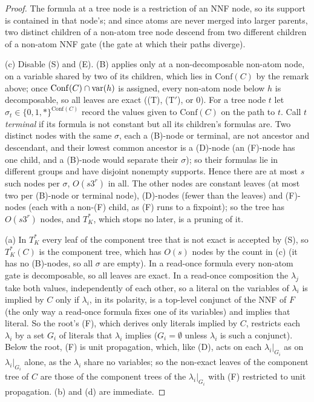\begin{proof}
The formula at a tree node is a restriction of an NNF node, so its support is
contained in that node's; and since atoms are never merged into larger parents,
two distinct children of a non-atom tree node descend from two different children
of a non-atom NNF gate (the gate at which their paths diverge).

(c) Disable (S) and (E). (B) applies only at a non-decomposable non-atom node, on
a variable shared by two of its children, which lies in $\mathrm{Conf}(C)$ by the
remark above; once $\mathrm{Conf}(C)\cap\mathrm{var}(h)$ is assigned, every non-atom node
below $h$ is decomposable, so all leaves are exact ((T), (T$'$), or $0$). For a
tree node $t$ let $\sigma_t\in\{0,1,*\}^{\mathrm{Conf}(C)}$ record the values given
to $\mathrm{Conf}(C)$ on the path to $t$. Call $t$ \emph{terminal} if its formula is
not constant but all its children's formulas are. Two distinct nodes with the same
$\sigma$, each a (B)-node or terminal, are not ancestor and descendant, and their
lowest common ancestor is a (D)-node (an (F)-node has one child, and a (B)-node
would separate their $\sigma$); so their formulas lie in different groups and have
disjoint nonempty supports. Hence there are at most $s$ such nodes per $\sigma$,
$O(s3^r)$ in all. The other nodes are constant leaves (at most two per (B)-node or
terminal node), (D)-nodes (fewer than the leaves) and (F)-nodes (each with a
non-(F) child, as (F) runs to a fixpoint); so the tree has $O(s3^r)$ nodes, and
$T^*_K$, which stops no later, is a pruning of it.

(a) In $T^*_K$ every leaf of the component tree that is not exact is accepted by
(S), so $T^*_K(C)$ is the component tree, which has $O(s)$ nodes by the count in
(c) (it has no (B)-nodes, so all $\sigma$ are empty). In a read-once formula every
non-atom gate is decomposable, so all leaves are exact. In a read-once composition
the $\lambda_j$ take both values, independently of each other, so a literal on the
variables of $\lambda_i$ is implied by $C$ only if $\lambda_i$, in its polarity, is a
top-level conjunct of the NNF of $F$ (the only way a read-once formula fixes one of
its variables) and implies that literal. So the root's (F), which derives only
literals implied by $C$, restricts each $\lambda_i$ by a set $G_i$ of literals that
$\lambda_i$ implies ($G_i=\emptyset$ unless $\lambda_i$ is such a
conjunct). Below the root, (F) is unit propagation, which, like (D), acts on each
$\lambda_i|_{G_i}$ as on $\lambda_i|_{G_i}$ alone, as the $\lambda_i$ share no
variables; so the non-exact leaves of the component tree of $C$ are those of the
component trees of the $\lambda_i|_{G_i}$ with (F) restricted to unit propagation.
(b) and (d) are immediate.
\end{proof}

